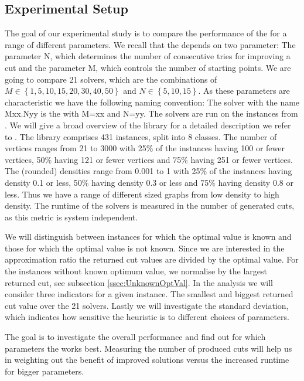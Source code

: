 \documentclass[12pt,a4paper]{article}
\theoremstyle{mythm}
\begin{document}
\subsection{Experimental Setup} 
The goal of our experimental study is to compare the performance of the \BH for a range of different parameters.
We recall that the \BH depends on two parameter:
The parameter N, which determines the number of consecutive tries for improving a cut and the parameter M, which controls the number of starting points.
We are going to compare 21 solvers, which are the combinations of $ M \in \left\{ 1, 5, 10, 15, 20, 30, 40, 50 \right\}  $ and $ N \in \left\{ 5, 10 , 15 \right\}  $.
As these parameters are characteristic we have the following naming convention:
The solver with the name Mxx.Nyy is the \BH with M=xx and N=yy.
The solvers are run on the instances from \MallachLibrary.
We will give a broad overview of the library for a detailed description we refer to \cite{MallachLibrary}.
The library comprises 431 instances, split into 8 classes.
The number of vertices ranges from 21 to 3000 with 25\% of the instances having 100 or fewer vertices, 50\% having 121 or fewer vertices and 75\% having 251 or fewer vertices.
The (rounded) densities range from 0.001 to 1 with 25\% of the instances having density 0.1 or less, 50\% having density 0.3 or less and 75\% having density 0.8 or less.
Thus we have a range of different sized graphs from low density to high density.
The runtime of the solvers is measured in the number of generated cuts, as this metric is system independent.

We will distinguish between instances for which the optimal value is known and those for which the optimal value is not known.
Since we are interested in the approximation ratio the returned cut values are divided by the optimal value.
For the instances without known optimum value, we normalise by the largest returned cut, see subsection \ref{ssec:UnknownOptVal}.
In the analysis we will consider three indicators for a given instance.
The smallest and biggest returned cut value over the 21 solvers.
Lastly we will investigate the standard deviation, which indicates how sensitive the heuristic is to different choices of parameters.

The goal is to investigate the overall performance and find out for which parameters the \BH works best.
Measuring the number of produced cuts will help us in weighting out the benefit of improved solutions versus the increased runtime for bigger parameters.
\end{document}
